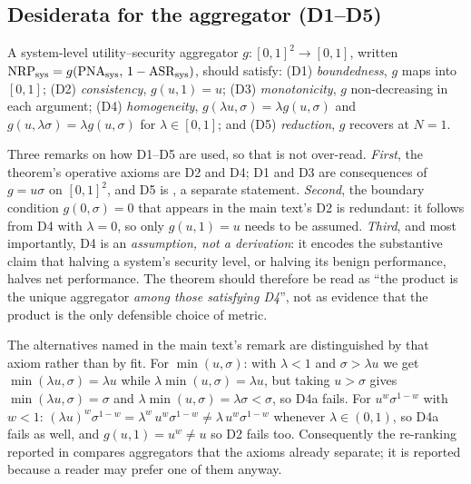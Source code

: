 \subsection{Desiderata for the aggregator (D1--D5)}
A system-level utility--security aggregator $g:[0,1]^2\to[0,1]$, written
$\mathrm{NRP}_{\mathrm{sys}}=g(\mathrm{PNA}_{\mathrm{sys}},\,1-\mathrm{ASR}_{\mathrm{sys}})$, should satisfy: (D1) \emph{boundedness}, $g$ maps into
$[0,1]$; (D2) \emph{consistency}, $g(u,1)=u$; (D3) \emph{monotonicity}, $g$ non-decreasing
in each argument; (D4) \emph{homogeneity}, $g(\lambda u,\sigma)=\lambda g(u,\sigma)$ and
$g(u,\lambda\sigma)=\lambda g(u,\sigma)$ for $\lambda\in[0,1]$; and (D5) \emph{reduction},
$g$ recovers  at $N=1$.

Three remarks on how D1--D5 are used, so that  is not over-read.
\emph{First}, the theorem's operative axioms are D2 and D4; D1 and D3 are consequences of
$g=u\sigma$ on $[0,1]^2$, and D5 is , a separate statement. \emph{Second},
the boundary condition $g(0,\sigma)=0$ that appears in the main text's D2 is redundant: it
follows from D4 with $\lambda=0$, so only $g(u,1)=u$ needs to be assumed. \emph{Third}, and
most importantly, D4 is an \emph{assumption, not a derivation}: it encodes the substantive
claim that halving a system's security level, or halving its benign performance, halves net
performance. The theorem should therefore be read as ``the product is the unique aggregator
\emph{among those satisfying D4}'', not as evidence that the product is the only defensible
choice of metric.

The alternatives named in the main text's remark are distinguished by that axiom rather than
by fit. For $\min(u,\sigma)$: with $\lambda<1$ and $\sigma>\lambda u$ we get
$\min(\lambda u,\sigma)=\lambda u$ while $\lambda\min(u,\sigma)=\lambda u$, but taking
$u>\sigma$ gives $\min(\lambda u,\sigma)=\sigma$ and $\lambda\min(u,\sigma)=\lambda\sigma<\sigma$,
so D4a fails. For $u^{w}\sigma^{1-w}$ with $w<1$:
$(\lambda u)^{w}\sigma^{1-w}=\lambda^{w}\,u^{w}\sigma^{1-w}\neq\lambda\,u^{w}\sigma^{1-w}$
whenever $\lambda\in(0,1)$, so D4a fails as well, and $g(u,1)=u^{w}\neq u$ so D2 fails too.
Consequently the re-ranking reported in  compares aggregators that the
axioms already separate; it is reported because a reader may prefer one of them anyway.

